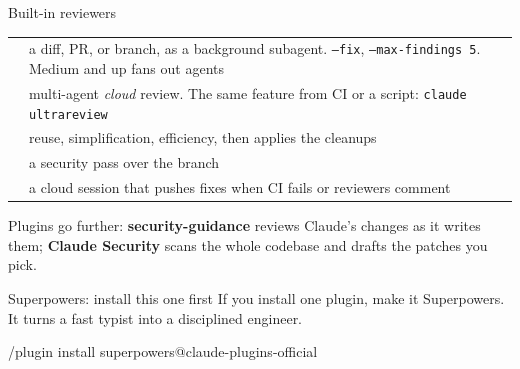 \documentclass[aspectratio=169,11pt,t]{beamer}
\begin{document}
\begin{frame}{Built-in reviewers}
  \footnotesize
  \begin{tabularx}{\textwidth}{@{}L{3.6cm}Y@{}}
    \toprule
     & \\
    \midrule
     & a diff, PR, or branch, as a background subagent. \texttt{--fix}, \texttt{--max-findings 5}. Medium and up fans out agents\\
     & multi-agent \emph{cloud} review. The same feature from CI or a script: \texttt{claude ultrareview}\\
     & reuse, simplification, efficiency, then applies the cleanups\\
     & a security pass over the branch\\
     & a cloud session that pushes fixes when CI fails or reviewers comment\\
    \bottomrule
  \end{tabularx}\par\vspace{0.5em}
  \small Plugins go further: \textbf{security-guidance} reviews Claude's changes as it writes them; \textbf{Claude Security} scans the whole codebase and drafts the patches you pick.
\end{frame}

\begin{frame}[fragile]{Superpowers: install this one first}
  If you install one plugin, make it Superpowers. It turns a fast typist into a disciplined engineer.\par\vspace{0.9em}
  \centering
  \par\vspace{0.8em}
  \raggedright\footnotesize
       \par\vspace{0.6em}
\begin{code}
/plugin install superpowers@claude-plugins-official
\end{code}
\end{frame}
\end{document}
